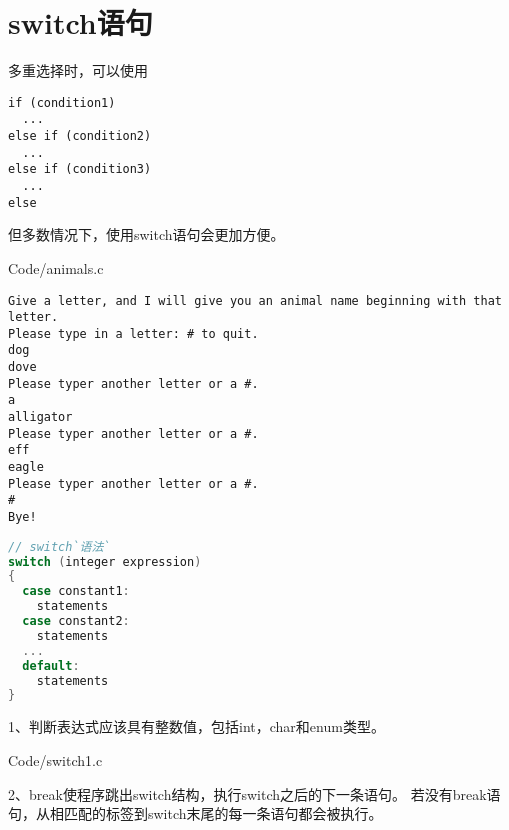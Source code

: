 \section{switch语句}
\begin{frame}[fragile]\ft{\secname}
多重选择时，可以使用
\begin{lstlisting}
if (condition1)
  ...
else if (condition2)
  ...
else if (condition3)
  ...
else    
\end{lstlisting}
但多数情况下，使用switch语句会更加方便。
\end{frame}

\begin{frame}\ft{\secname}

{Code/animals.c}
\end{frame}


\begin{frame}[fragile]\ft{\secname}
\begin{lstlisting}[backgroundcolor=\color{blue!20}]
Give a letter, and I will give you an animal name beginning with that letter.
Please type in a letter: # to quit.
dog
dove
Please typer another letter or a #.
a
alligator
Please typer another letter or a #.
eff
eagle
Please typer another letter or a #.
#
Bye!
\end{lstlisting}
\end{frame}

\begin{frame}[fragile]\ft{\secname}
\begin{lstlisting}[language=c,frame=single]
// switch`语法`
switch (integer expression)
{
  case constant1:
    statements
  case constant2:
    statements
  ...
  default:
    statements
}    
\end{lstlisting}
\end{frame}

\begin{frame}[fragile]\ft{\secname}
  1、判断表达式应该具有整数值，包括int，char和enum类型。
\end{frame}

\begin{frame}[fragile]\ft{\secname}
  
  {Code/switch1.c}
\end{frame}

\begin{frame}[fragile]\ft{\secname}
2、break使程序跳出switch结构，执行switch之后的下一条语句。
若没有break语句，从相匹配的标签到switch末尾的每一条语句都会被执行。
\end{frame}

